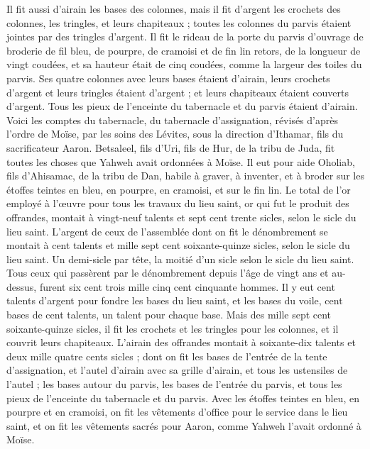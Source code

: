 \begin{multicols}{2}
Il fit aussi d'airain les bases des colonnes, mais il fit d'argent les crochets des colonnes, les tringles, et leurs chapiteaux ; toutes les colonnes du parvis étaient jointes par des tringles d’argent.
Il fit le rideau de la porte du parvis d'ouvrage de broderie de fil bleu, de pourpre, de cramoisi et de fin lin retors, de la longueur de vingt coudées, et sa hauteur était de cinq coudées, comme la largeur des toiles du parvis.
Ses quatre colonnes avec leurs bases étaient d'airain, leurs crochets d'argent et leurs tringles étaient d’argent ; et leurs chapiteaux étaient couverts d'argent.
Tous les pieux de l’enceinte du tabernacle et du parvis étaient d'airain.
Voici les comptes du tabernacle, du tabernacle d’assignation, révisés d’après l’ordre de Moïse, par les soins des Lévites, sous la direction d’Ithamar, fils du sacrificateur Aaron.
Betsaleel, fils d'Uri, fils de Hur, de la tribu de Juda, fit toutes les choses que Yahweh avait ordonnées à Moïse.
Il eut pour aide Oholiab, fils d'Ahisamac, de la tribu de Dan, habile à graver, à inventer, et à broder sur les étoffes teintes en bleu, en pourpre, en cramoisi, et sur le fin lin.
Le total de l’or employé à l’œuvre pour tous les travaux du lieu saint, or qui fut le produit des offrandes, montait à vingt-neuf talents et sept cent trente sicles, selon le sicle du lieu saint.
L'argent de ceux de l'assemblée dont on fit le dénombrement se montait à cent talents et mille sept cent soixante-quinze sicles, selon le sicle du lieu saint.
Un demi-sicle par tête, la moitié d'un sicle selon le sicle du lieu saint. Tous ceux qui passèrent par le dénombrement depuis l'âge de vingt ans et au-dessus, furent six cent trois mille cinq cent cinquante hommes.
Il y eut cent talents d'argent pour fondre les bases du lieu saint, et les bases du voile, cent bases de cent talents, un talent pour chaque base.
Mais des mille sept cent soixante-quinze sicles, il fit les crochets et les tringles pour les colonnes, et il couvrit leurs chapiteaux.
L'airain des offrandes montait à soixante-dix talents et deux mille quatre cents sicles ;
dont on fit les bases de l’entrée de la tente d'assignation, et l'autel d'airain avec sa grille d'airain, et tous les ustensiles de l'autel ;
les bases autour du parvis, les bases de l’entrée du parvis, et tous les pieux de l’enceinte du tabernacle et du parvis. Avec les étoffes teintes en bleu, en pourpre et en cramoisi, on fit les vêtements d’office pour le service dans le lieu saint, et on fit les vêtements sacrés pour Aaron, comme Yahweh l’avait ordonné à Moïse.

\end{multicols}
